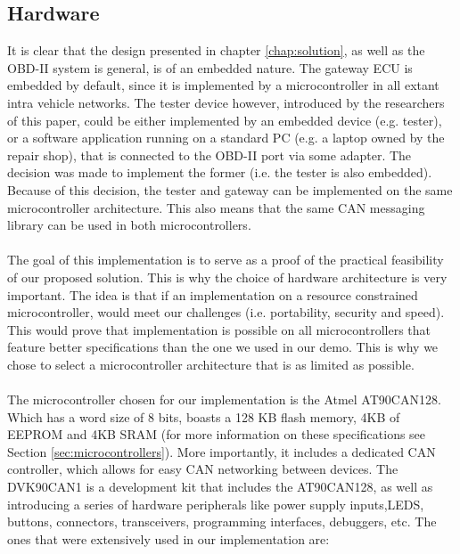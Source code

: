 \subsection{Hardware}
\label{sec:hardware}
It is clear that the design presented in chapter \ref{chap:solution}, as well as the OBD-II system is general, is of an embedded nature. The gateway ECU is embedded by default, since it is implemented by a microcontroller in all extant intra vehicle networks. The tester device however, introduced by the researchers of this paper, could be either implemented by an embedded device (e.g. tester), or a software application running on a standard PC (e.g. a laptop owned by the repair shop), that is connected to the OBD-II port via some adapter. The decision was made to implement the former (i.e. the tester is also embedded). Because of this decision, the tester and gateway can be implemented on the same microcontroller architecture. This also means that the same CAN messaging library can be used in both microcontrollers.\\ \\ The goal of this implementation is to serve as a proof of the practical feasibility of our proposed solution. This is why the choice of hardware architecture is very important. The idea is that if an implementation on a resource constrained microcontroller, would meet our challenges (i.e. portability, security and speed). This would prove that implementation is possible on all microcontrollers that feature better specifications than the one we used in our demo. This is why we chose to select a microcontroller architecture that is as limited as possible.  \\ \\ The microcontroller chosen for our implementation is the Atmel AT90CAN128. Which has a word size of 8 bits, boasts a 128 KB flash memory, 4KB of EEPROM and 4KB SRAM (for more information on these specifications see  Section \ref{sec:microcontrollers}). More importantly, it includes a dedicated CAN controller, which allows for easy CAN networking between devices. The DVK90CAN1 is a development kit that includes the AT90CAN128, as well as introducing a series of hardware peripherals like power supply inputs,LEDS, buttons, connectors, transceivers, programming interfaces, debuggers, etc. The ones that were extensively used in our implementation are:
